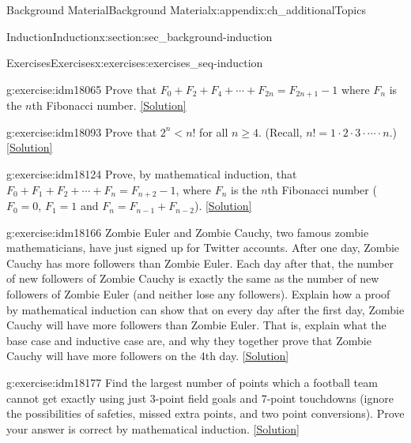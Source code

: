 \documentclass[oneside,10pt,]{book}
\numberwithin{equation}{chapter}
\newcommand{\lt}{<}
\begin{document}
\begin{appendixptx}{Background Material}{}{Background Material}{}{}{x:appendix:ch_additionalTopics}
\begin{sectionptx}{Induction}{}{Induction}{}{}{x:section:sec_background-induction}
\begin{exercises-subsection}{Exercises}{}{Exercises}{}{}{x:exercises:exercises_seq-induction}
\begin{divisionexercise}{4}{}{}{g:exercise:idm18065}%
Prove that \(F_0 + F_2 + F_4 + \cdots + F_{2n} = F_{2n+1} - 1\) where \(F_n\) is the \(n\)th Fibonacci number.%
\space\hspace*{0pt}\hfill{\tiny\hyperlink{g:solution:idm18071-main}{[Solution]}}\end{divisionexercise}%
\begin{divisionexercise}{5}{}{}{g:exercise:idm18093}%
Prove that \(2^n \lt  n!\) for all \(n \ge 4\). (Recall, \(n! = 1\cdot 2 \cdot 3 \cdot \cdots\cdot n\).)%
\space\hspace*{0pt}\hfill{\tiny\hyperlink{g:solution:idm18099-main}{[Solution]}}\end{divisionexercise}%
\begin{divisionexercise}{6}{}{}{g:exercise:idm18124}%
Prove, by mathematical induction, that \(F_0 + F_1 + F_2 + \cdots + F_{n} = F_{n+2} - 1\), where \(F_n\) is the \(n\)th Fibonacci number (\(F_0 = 0\), \(F_1 = 1\) and \(F_n = F_{n-1} + F_{n-2}\)).%
\space\hspace*{0pt}\hfill{\tiny\hyperlink{g:solution:idm18133-main}{[Solution]}}\end{divisionexercise}%
\begin{divisionexercise}{7}{}{}{g:exercise:idm18166}%
Zombie Euler and Zombie Cauchy, two famous zombie mathematicians, have just signed up for Twitter accounts. After one day, Zombie Cauchy has more followers than Zombie Euler. Each day after that, the number of new followers of Zombie Cauchy is exactly the same as the number of new followers of Zombie Euler (and neither lose any followers). Explain how a proof by mathematical induction can show that on every day after the first day, Zombie Cauchy will have more followers than Zombie Euler. That is, explain what the base case and inductive case are, and why they together prove that Zombie Cauchy will have more followers on the 4th day.%
\space\hspace*{0pt}\hfill{\tiny\hyperlink{g:solution:idm18169-main}{[Solution]}}\end{divisionexercise}%
\begin{divisionexercise}{8}{}{}{g:exercise:idm18177}%
Find the largest number of points which a football team cannot get exactly using just 3-point field goals and 7-point touchdowns (ignore the possibilities of safeties, missed extra points, and two point conversions). Prove your answer is correct by mathematical induction.%
\space\hspace*{0pt}\hfill{\tiny\hyperlink{g:solution:idm18180-main}{[Solution]}}\end{divisionexercise}%

\end{exercises-subsection}
\end{sectionptx}
\end{appendixptx}
\end{document}
